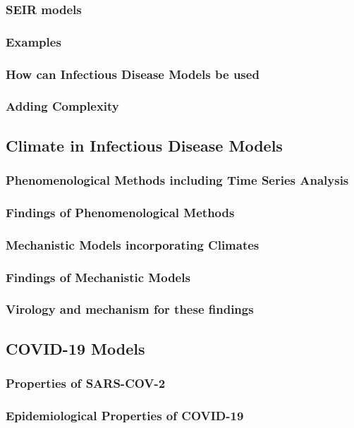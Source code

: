 \documentclass[11pt]{article}
\begin{document}
\subsubsection{SEIR models} %
\subsubsection{Examples}
\subsubsection{How can Infectious Disease Models be used}
\subsubsection{Adding Complexity}
\subsection{Climate in Infectious Disease Models}
\subsubsection{Phenomenological Methods including Time Series Analysis}
\subsubsection{Findings of Phenomenological Methods}
\subsubsection{Mechanistic Models incorporating Climates}
\subsubsection{Findings of Mechanistic Models}
\subsubsection{Virology and mechanism for these findings}
\subsection{COVID-19 Models}
\subsubsection{Properties of SARS-COV-2}
\subsubsection{Epidemiological Properties of COVID-19}
\end{document}
